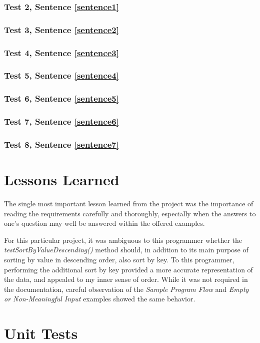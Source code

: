 \documentclass{scrartcl}
\begin{document}
\subsubsection{Test 2, Sentence \ref{sentence1}}

\clearpage
\subsubsection{Test 3, Sentence \ref{sentence2}}

\clearpage
\subsubsection{Test 4, Sentence \ref{sentence3}}

\clearpage
\subsubsection{Test 5, Sentence \ref{sentence4}}

\clearpage
\subsubsection{Test 6, Sentence \ref{sentence5}}

\clearpage
\subsubsection{Test 7, Sentence \ref{sentence6}}

\clearpage
\subsubsection{Test 8, Sentence \ref{sentence7}}

\clearpage
\section{Lessons Learned}
The single most important lesson learned from the project was the importance
of reading the requirements carefully and thoroughly, especially when
the answers to one's question may well be answered within the offered examples.

For this particular project, it was ambiguous to this programmer whether the
\emph{testSortByValueDescending()} method should, in addition to its main
purpose of sorting by value in descending order, also sort by key.  To this
programmer, performing the additional sort by key provided a more accurate
representation of the data, and appealed to my inner sense of order.  While
it was not required in the documentation, careful observation of the
\emph{Sample Program Flow} and \emph{Empty or Non-Meaningful Input} examples
showed the same behavior.
\newpage
\section{Unit Tests}
\label{sec:unittests}

\end{document}
